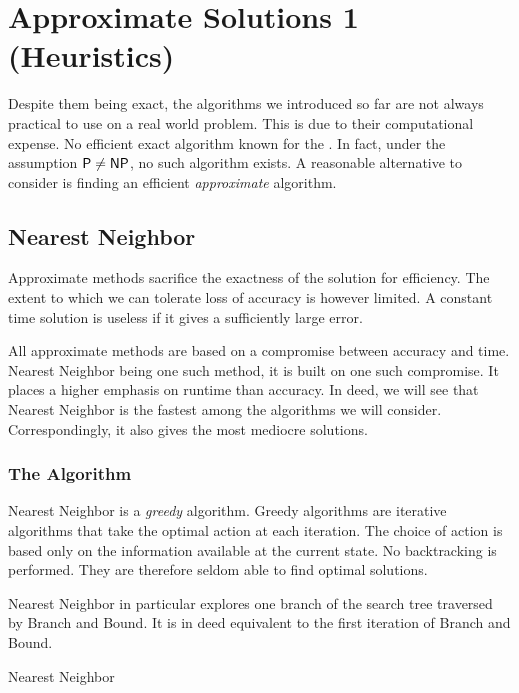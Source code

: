 \chapter{Approximate Solutions 1 (Heuristics)}

Despite them being exact, the algorithms we introduced so far are not always practical to use on a real world problem. This is due to their computational expense. No efficient exact algorithm known for the \TSP. In fact, under the assumption \(\textsf{P}\neq\textsf{NP}\), no such algorithm exists. A reasonable alternative to consider is finding an efficient \emph{approximate} algorithm.

\section{Nearest Neighbor}

Approximate methods sacrifice the exactness of the solution for efficiency. The extent to which we can tolerate loss of accuracy is however limited. A constant time solution is useless if it gives a sufficiently large error.

All approximate methods are based on a compromise between accuracy and time. Nearest Neighbor being one such method, it is built on one such compromise. It places a higher emphasis on runtime than accuracy. In deed, we will see that Nearest Neighbor is the fastest among the algorithms we will consider. Correspondingly, it also gives the most mediocre solutions.

\subsection{The Algorithm}

Nearest Neighbor is a \emph{greedy} algorithm. Greedy algorithms are iterative algorithms that take the optimal action at each iteration. The choice of action is based only on the information available at the current state. No backtracking is performed. They are therefore seldom able to find optimal solutions.

Nearest Neighbor in particular explores one branch of the search tree traversed by Branch and Bound. It is in deed equivalent to the first iteration of Branch and Bound.
\begin{algorithm}
    \caption{Nearest Neighbor}
    \label{algo:nearest-neighbor}
     
\end{algorithm}


